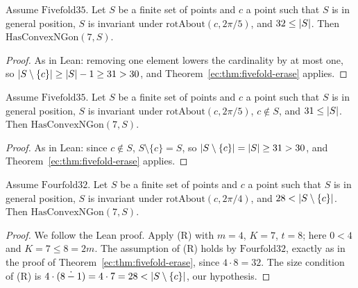 \begin{theorem}\label{ec:thm:fivefold}
Assume $\mathrm{Fivefold35}$. Let $S$ be a finite set of points and $c$ a point such that $S$ is in general position,
$S$ is invariant under $\mathrm{rotAbout}(c,2\pi/5)$, and $32\le\lvert S\rvert$. Then $\mathrm{HasConvexNGon}(7,S)$.
\end{theorem}

\begin{proof}
As in Lean: removing one element lowers the cardinality by at most one, so
$\lvert S\setminus\{c\}\rvert\ge\lvert S\rvert-1\ge31>30$, and Theorem~\ref{ec:thm:fivefold-erase} applies.
\end{proof}

\begin{theorem}\label{ec:thm:fivefold-nc}
Assume $\mathrm{Fivefold35}$. Let $S$ be a finite set of points and $c$ a point such that $S$ is in general position,
$S$ is invariant under $\mathrm{rotAbout}(c,2\pi/5)$, $c\notin S$, and $31\le\lvert S\rvert$. Then
$\mathrm{HasConvexNGon}(7,S)$.
\end{theorem}

\begin{proof}
As in Lean: since $c\notin S$, $S\setminus\{c\}=S$, so $\lvert S\setminus\{c\}\rvert=\lvert S\rvert\ge31>30$, and
Theorem~\ref{ec:thm:fivefold-erase} applies.
\end{proof}

\begin{theorem}\label{ec:thm:fourfold-erase}
Assume $\mathrm{Fourfold32}$. Let $S$ be a finite set of points and $c$ a point such that $S$ is in general position,
$S$ is invariant under $\mathrm{rotAbout}(c,2\pi/4)$, and $28<\lvert S\setminus\{c\}\rvert$. Then
$\mathrm{HasConvexNGon}(7,S)$.
\end{theorem}

\begin{proof}
We follow the Lean proof. Apply (R) with $m=4$, $K=7$, $t=8$; here $0<4$ and $K=7\le8=2m$. The assumption of (R)
holds by $\mathrm{Fourfold32}$, exactly as in the proof of Theorem~\ref{ec:thm:fivefold-erase}, since $4\cdot8=32$.
The size condition of (R) is $4\cdot(8\mathbin{\dot{-}}1)=4\cdot7=28<\lvert S\setminus\{c\}\rvert$, our hypothesis.
\end{proof}

